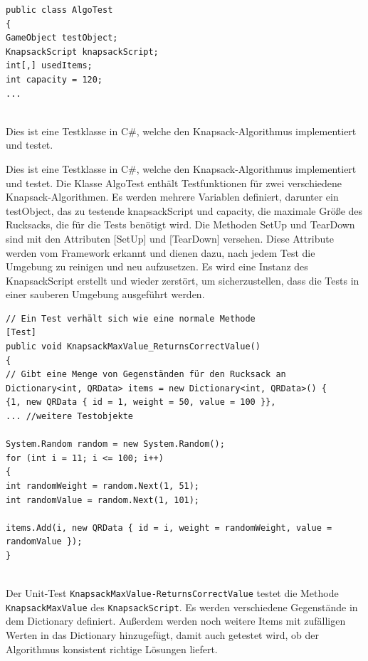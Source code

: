 \begin{lstlisting}[style=csharp, caption={Unit Test Klasse}, label=code:UnitTest]
public class AlgoTest
{
GameObject testObject;
KnapsackScript knapsackScript;
int[,] usedItems;
int capacity = 120;
...
\end{lstlisting}\\

Dies ist eine Testklasse in C#, welche den Knapsack-Algorithmus implementiert und testet.

Dies ist eine Testklasse in C#, welche den Knapsack-Algorithmus implementiert und testet. Die Klasse AlgoTest enthält
Testfunktionen für zwei verschiedene Knapsack-Algorithmen. Es werden mehrere Variablen definiert, darunter ein testObject,
das zu testende knapsackScript und capacity, die maximale Größe des Rucksacks, die für die Tests benötigt wird. Die Methoden
SetUp und TearDown sind mit den Attributen [SetUp] und [TearDown] versehen. Diese Attribute werden vom Framework erkannt
und dienen dazu, nach jedem Test die Umgebung zu reinigen und neu aufzusetzen. Es wird eine Instanz des KnapsackScript
erstellt und wieder zerstört, um sicherzustellen, dass die Tests in einer sauberen Umgebung ausgeführt werden.

\begin{lstlisting}[style=csharp, caption={Unit Test Methode}, label=code:Test Methode]
// Ein Test verhält sich wie eine normale Methode
[Test]
public void KnapsackMaxValue_ReturnsCorrectValue()
{
// Gibt eine Menge von Gegenständen für den Rucksack an
Dictionary<int, QRData> items = new Dictionary<int, QRData>() {
{1, new QRData { id = 1, weight = 50, value = 100 }},
... //weitere Testobjekte

System.Random random = new System.Random();
for (int i = 11; i <= 100; i++)
{
int randomWeight = random.Next(1, 51);
int randomValue = random.Next(1, 101);

items.Add(i, new QRData { id = i, weight = randomWeight, value = randomValue });
}
\end{lstlisting}\\

Der Unit-Test \texttt{KnapsackMaxValue-ReturnsCorrectValue} testet die Methode \texttt{KnapsackMaxValue} des
\texttt{KnapsackScript}. Es werden verschiedene Gegenstände in dem Dictionary definiert. Außerdem werden noch weitere
Items mit zufälligen Werten in das Dictionary hinzugefügt, damit auch getestet wird, ob der Algorithmus konsistent richtige
Lösungen liefert.


